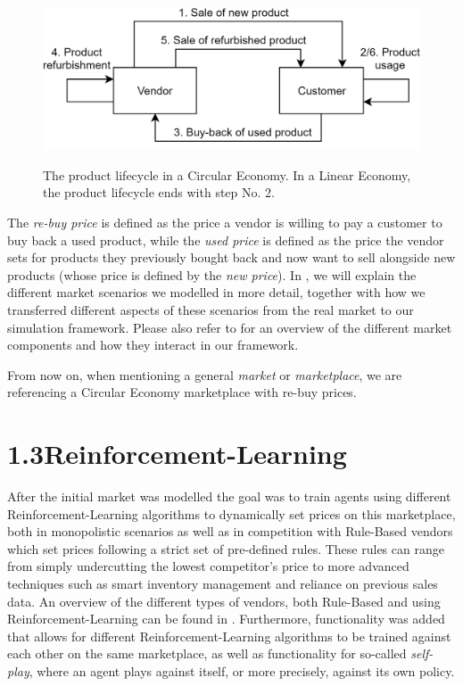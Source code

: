 \begin{figure}[t]
	\centering
	\includegraphics[width = \textwidth]{images/product_lifecycle.png}\\
	\caption{The product lifecycle in a Circular Economy. In a Linear Economy, the product lifecycle ends with step No. 2.}\label{fig:IntroMarketDynamics}
\end{figure}

The \emph{re-buy price} is defined as the price a vendor is willing to pay a customer to buy back a used product, while the \emph{used price} is defined as the price the vendor sets for products they previously bought back and now want to sell alongside new products (whose price is defined by the \emph{new price}). In , we will explain the different market scenarios we modelled in more detail, together with how we transferred different aspects of these scenarios from the real market to our simulation framework. Please also refer to  for an overview of the different market components and how they interact in our framework.

From now on, when mentioning a general \emph{market} or \emph{marketplace}, we are referencing a Circular Economy marketplace with re-buy prices.

\section*{1.3\space\space Reinforcement-Learning}\label{sec:ReinforcementLearningIntroduction}

After the initial market was modelled the goal was to train agents using different Reinforcement-Learning algorithms to dynamically set prices on this marketplace, both in monopolistic scenarios as well as in competition with Rule-Based vendors which set prices following a strict set of pre-defined rules. These rules can range from simply undercutting the lowest competitor's price to more advanced techniques such as smart inventory management and reliance on previous sales data. An overview of the different types of vendors, both Rule-Based and using Reinforcement-Learning can be found in . Furthermore, functionality was added that allows for different Reinforcement-Learning algorithms to be trained against each other on the same marketplace, as well as functionality for so-called \emph{self-play}, where an agent plays against itself, or more precisely, against its own policy.

